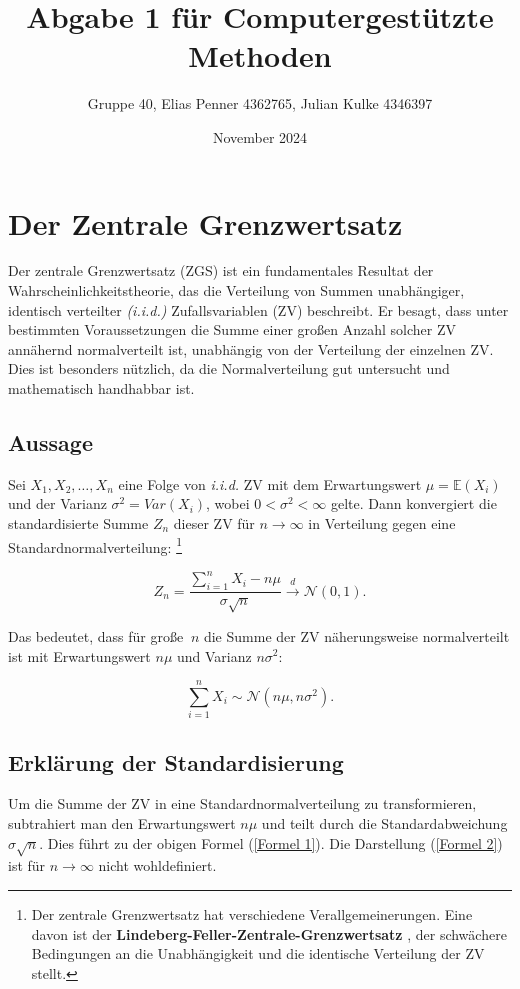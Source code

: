 \documentclass[a4paper, 12pt]{article}
\title{Abgabe 1 für Computergestützte Methoden}
\author{Gruppe 40, Elias Penner 4362765, Julian Kulke 4346397 }
\date{November 2024}
\begin{document}
\maketitle

\tableofcontents
\newpage

\section{Der Zentrale Grenzwertsatz}
Der zentrale Grenzwertsatz (ZGS) ist ein fundamentales Resultat der Wahrscheinlichkeitstheorie, das die Verteilung von Summen unabhängiger, identisch
verteilter \textit{(i.i.d.)} Zufallsvariablen (ZV) beschreibt. Er besagt, dass unter bestimmten Voraussetzungen die Summe einer großen Anzahl solcher ZV annähernd
normalverteilt ist, unabhängig von der Verteilung der einzelnen ZV. Dies ist besonders nützlich, da die Normalverteilung gut untersucht und mathematisch handhabbar ist.

\subsection{Aussage}
Sei \(X_1, X_2,\ldots, X_n\) eine Folge von \textit{i.i.d.} ZV mit dem Erwartungswert $\mu = \mathbb{E}(X_i)$ und der Varianz \(\sigma^2 =Var(X_i) \), wobei \(0< \sigma^2 < \infty\) gelte. Dann konvergiert die standardisierte Summe \(Z_n\) dieser ZV für \(n \rightarrow \infty\) in Verteilung gegen eine
Standardnormalverteilung:
\footnote{Der zentrale Grenzwertsatz hat verschiedene Verallgemeinerungen. Eine davon ist der \textbf{Lindeberg-Feller-Zentrale-Grenzwertsatz} \cite[Seite 328]{Wahrscheinlichkeitstheorie_Achim_Klenke}, der schwächere Bedingungen an
die Unabhängigkeit und die identische Verteilung der ZV stellt.}


\[Z_n = \frac{\sum_{i=1}^n X_i-n\mu}{\sigma \sqrt{n}} \xrightarrow{d} \mathcal{N}(0, 1). \tag{1} \label{Formel 1}\]


Das bedeutet, dass für große \(\ n\) die Summe der ZV näherungsweise normalverteilt
ist mit Erwartungswert \(n\mu\) und Varianz \(n\sigma^2\):

\[\sum_{i=1}^n X_i \sim \mathcal{N}(n\mu, n\sigma^2). \tag{2} \label{Formel 2}\]

\subsection{Erklärung der Standardisierung}
Um die Summe der ZV in eine Standardnormalverteilung zu transformieren, subtrahiert man den Erwartungswert \(n\mu\) und teilt durch die Standardabweichung \(\sigma \sqrt{n}\). Dies führt zu der obigen Formel (\ref{Formel 1}). Die Darstellung (\ref{Formel 2}) ist für \(n \rightarrow \infty\) nicht wohldefiniert.
\end{document}
